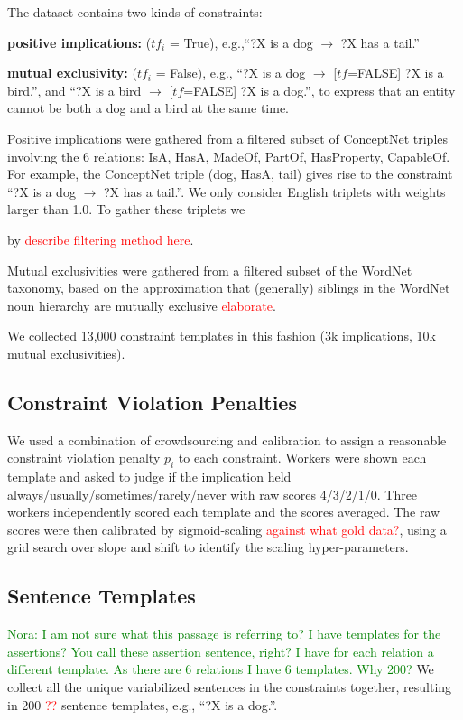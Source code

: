 \documentclass[11pt]{article}
\newcommand{\nk}[1]{\textcolor{green}{Nora: #1}}
\newcommand{\red}[1]{\textcolor{red}{#1}}
\newenvironment{des}{                 %
     \parskip 0cm \begin{list}{}{\parsep 0cm \itemsep 0cm \topsep 0cm}}{
       \end{list}} %
\begin{document}
\noindent
The dataset contains two kinds of constraints:
\begin{des}
\item[{\bf positive implications:}] ($tf_i$ = True), e.g.,``?X is a dog $\rightarrow$ ?X has a tail.''
\item[{\bf mutual exclusivity:}] ($tf_i$ = False), e.g.,
``?X is a dog $\rightarrow$ [$tf$=FALSE] ?X is a bird.'',
and ``?X is a bird $\rightarrow$ [$tf$=FALSE] ?X is a dog.'', to
express that an entity cannot be both a dog and a bird at the same time.

\end{des}
Positive implications were gathered from a filtered subset of ConceptNet triples involving the 6 relations: IsA, HasA, MadeOf, PartOf, HasProperty, CapableOf. For example, the ConceptNet triple (dog, HasA, tail) gives rise to the constraint ``?X is a dog $\rightarrow$ ?X has a tail.''. We only consider English triplets with weights larger than 1.0. To gather these triplets we 

by \red{describe filtering method here}.

Mutual exclusivities were gathered from a filtered subset of the WordNet taxonomy,
based on the approximation that (generally) siblings in the WordNet noun hierarchy
are mutually exclusive \red{elaborate}.

We collected 13,000 constraint templates in this fashion (3k implications, 10k mutual
exclusivities).

\subsection{Constraint Violation Penalties}

We used a combination of crowdsourcing and calibration to assign a reasonable
constraint violation penalty $p_i$ to each constraint. Workers were shown each
template and asked to judge if the implication held always/usually/sometimes/rarely/never with raw scores 4/3/2/1/0.
Three workers independently scored each template and the scores averaged.
The raw scores were then calibrated by sigmoid-scaling \red{against what gold data?}, using a
grid search over slope and shift to identify the scaling hyper-parameters.

\subsection{Sentence Templates}
\nk{I am not sure what this passage is referring to? I have templates for the assertions? You call these assertion sentence, right? I have for each relation a different template. As there are 6 relations I have 6 templates. Why 200?}
We collect all the unique variabilized sentences in the constraints together,
resulting in 200 \red{??} sentence templates, e.g., ``?X is a dog.''.
\end{document}
